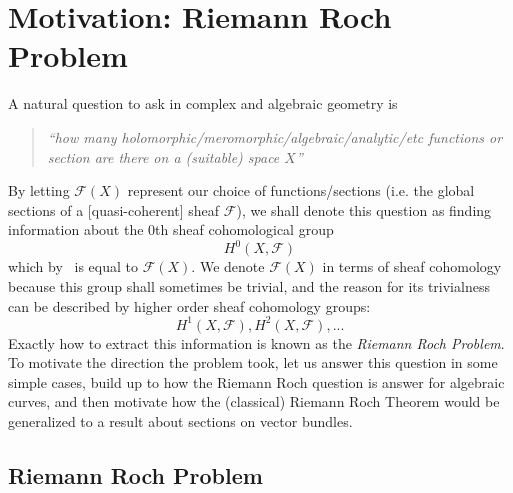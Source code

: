 \documentclass{book}
\newcommand{\CF}{{\mathcal{F}}}
\begin{document}

\chapter{Motivation: Riemann Roch Problem}\label{cha:motivation}


A natural question to ask in complex and algebraic geometry is
\begin{quote}
  \begin{center}
    \emph{``how many holomorphic/meromorphic/algebraic/analytic/etc functions or section are there on a (suitable) space
    $X$''}
\end{center}
\end{quote}

By letting $\CF(X)$ represent our choice of functions/sections (i.e. the global sections of a [quasi-coherent]
sheaf $\CF$), we shall denote this question as finding information about the $0$th sheaf cohomological group
\[
  H^0(X, \CF)
\]
which by~\cite{NateAlgGeo} is equal to $\CF(X)$. We denote $\CF(X)$ in terms of sheaf cohomology because this
group shall sometimes be trivial, and the reason for its trivialness can be described by higher order sheaf
cohomology groups:
\[
  H^1(X, \CF), H^2(X, \CF), ...
\]
Exactly how to extract this information is known as the \emph{Riemann Roch Problem}. To motivate the direction
the problem took, let us answer this question in some simple cases, build up to how the Riemann Roch question
is answer for algebraic curves, and then motivate how the (classical) Riemann Roch
Theorem would be generalized to a result about sections on vector bundles.

\section{Riemann Roch Problem}
\end{document}
